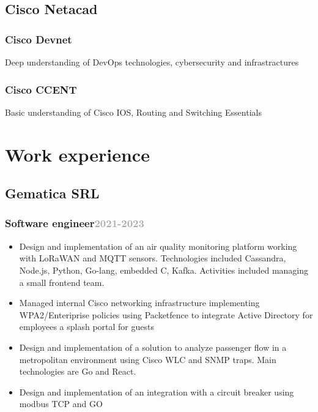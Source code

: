 \documentclass[11pt,a4paper]{article}
\begin{document}

  \subsection{Cisco Netacad}
  \subsubsection{Cisco Devnet} Deep understanding of DevOps technologies, cybersecurity and infrastractures
  \subsubsection{Cisco CCENT} Basic understanding of Cisco IOS, Routing and Switching Essentials

  \section*{Work experience}
  \subsection{Gematica SRL}
  \subsubsection{Software engineer\hfill \textcolor{darkgray}{\small{2021-2023}}}
  \begin{itemize}
    \item Design and implementation of an air quality monitoring platform working with LoRaWAN and MQTT sensors. Technologies included 
      Cassandra, Node.js, Python, Go-lang, embedded C, Kafka. Activities included managing a small frontend team.
    \item Managed internal Cisco networking infrastructure implementing WPA2/Enteriprise policies using Packetfence to integrate Active Directory for employees a splash portal for guests
    \item Design and implementation of a solution to analyze passenger flow in a metropolitan environment using Cisco WLC and SNMP traps. Main technologies are Go and React.
    \item Design and implementation of an integration with a circuit breaker using modbus TCP and GO
  \end{itemize}
\end{document}
